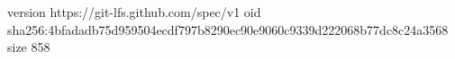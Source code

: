 version https://git-lfs.github.com/spec/v1
oid sha256:4bfadadb75d959504ecdf797b8290ec90e9060c9339d222068b77dc8c24a3568
size 858
